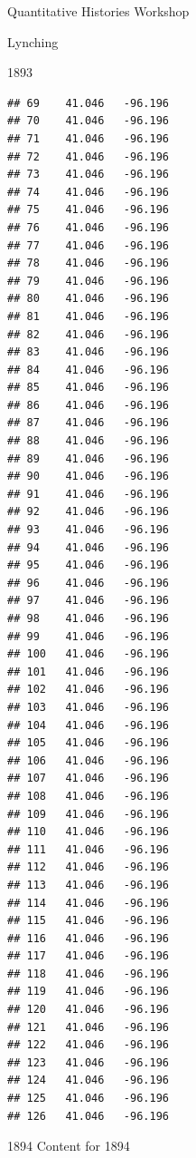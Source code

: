 \documentclass[
  ignorenonframetext,
]{beamer}
\begin{document}
\begin{frame}[fragile]{Quantitative Histories Workshop}
\begin{block}{Lynching}
\begin{block}{1893}
\begin{verbatim}
## 69    41.046   -96.196
## 70    41.046   -96.196
## 71    41.046   -96.196
## 72    41.046   -96.196
## 73    41.046   -96.196
## 74    41.046   -96.196
## 75    41.046   -96.196
## 76    41.046   -96.196
## 77    41.046   -96.196
## 78    41.046   -96.196
## 79    41.046   -96.196
## 80    41.046   -96.196
## 81    41.046   -96.196
## 82    41.046   -96.196
## 83    41.046   -96.196
## 84    41.046   -96.196
## 85    41.046   -96.196
## 86    41.046   -96.196
## 87    41.046   -96.196
## 88    41.046   -96.196
## 89    41.046   -96.196
## 90    41.046   -96.196
## 91    41.046   -96.196
## 92    41.046   -96.196
## 93    41.046   -96.196
## 94    41.046   -96.196
## 95    41.046   -96.196
## 96    41.046   -96.196
## 97    41.046   -96.196
## 98    41.046   -96.196
## 99    41.046   -96.196
## 100   41.046   -96.196
## 101   41.046   -96.196
## 102   41.046   -96.196
## 103   41.046   -96.196
## 104   41.046   -96.196
## 105   41.046   -96.196
## 106   41.046   -96.196
## 107   41.046   -96.196
## 108   41.046   -96.196
## 109   41.046   -96.196
## 110   41.046   -96.196
## 111   41.046   -96.196
## 112   41.046   -96.196
## 113   41.046   -96.196
## 114   41.046   -96.196
## 115   41.046   -96.196
## 116   41.046   -96.196
## 117   41.046   -96.196
## 118   41.046   -96.196
## 119   41.046   -96.196
## 120   41.046   -96.196
## 121   41.046   -96.196
## 122   41.046   -96.196
## 123   41.046   -96.196
## 124   41.046   -96.196
## 125   41.046   -96.196
## 126   41.046   -96.196
\end{verbatim}
\end{block}

\begin{block}{1894}
\protect\hypertarget{section-1}{}
Content for 1894


\end{block}
\end{block}
\end{frame}
\end{document}
